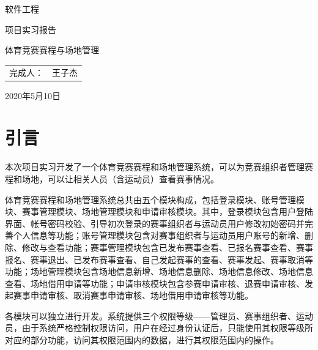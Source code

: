 \documentclass[a4paper,UTF8]{article}
\begin{document}
\newpage
\thispagestyle{empty}
\renewcommand{\baselinestretch}{1.6}  %
\vspace*{3.5cm}

\begin{center}{\Huge  软件工程 }\end{center}
\vspace*{0.5cm}
\begin{center}{\Huge  项目实习报告 }\end{center}
\vspace*{2cm}
\begin{center}{\huge 体育竞赛赛程与场地管理 }\end{center}
\vfill

\begin{center}
	\Large
	\begin{tabular}{ r l }
		完成人：&  {\sc 1401170224 王子杰}\\
	\end{tabular}

	\vspace*{9cm}
	
	2020年5月10日
\end{center}
\clearpage
\setcounter{page}{1}
\tableofcontents
\clearpage
\setcounter{page}{1}

\section{引言}
本次项目实习开发了一个体育竞赛赛程和场地管理系统，可以为竞赛组织者管理赛程和场地，可以让相关人员（含运动员）查看赛事情况。

体育竞赛赛程和场地管理系统总共由五个模块构成，包括登录模块、账号管理模块、赛事管理模块、场地管理模块和申请审核模块。其中，登录模块包含用户登陆界面、帐号密码校验、引导初次登录的赛事组织者与运动员用户修改初始密码并完善个人信息等功能；账号管理模块包含对赛事组织者与运动员用户账号的新增、删除、修改与查看功能；赛事管理模块包含已发布赛事查看、已报名赛事查看、赛事报名、赛事退出、已发布赛事查看、自己发起赛事的查看、赛事发起、赛事取消等功能；场地管理模块包含场地信息新增、场地信息删除、场地信息修改、场地信息查看、场地借用申请等功能；申请审核模块包含参赛申请审核、退赛申请审核、发起赛事申请审核、取消赛事申请审核、场地借用申请审核等功能。

各模块可以独立进行开发。系统提供三个权限等级——管理员、赛事组织者、运动员，由于系统严格控制权限访问，用户在经过身份认证后，只能使用其权限等级所对应的部分功能，访问其权限范围内的数据，进行其权限范围内的操作。
\end{document}
